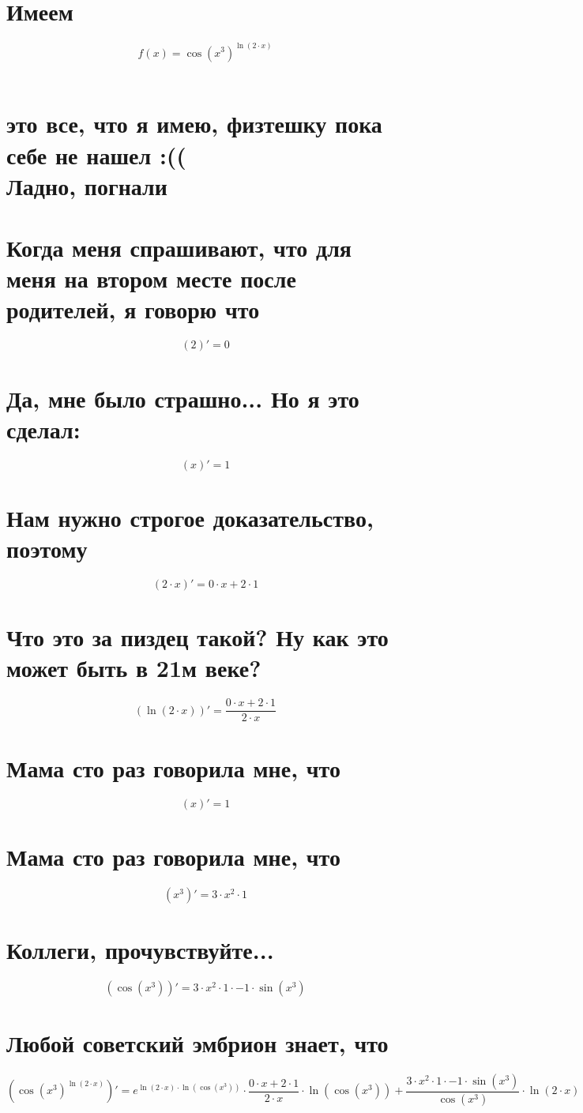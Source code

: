 \documentclass{article}
\begin{document}
\begin{Large}
\begin{onehalfspace}
\section*{Имеем}$$ f(x) = \cos(x^{3})^{\ln(2 \cdot x)}$$\\
\section*{это все, что я имею, физтешку пока себе не нашел :(( \\ Ладно, погнали}\section*{Когда меня спрашивают, что для меня на втором месте после родителей, я говорю что}
$$(2)' = 0$$
\section*{Да, мне было страшно... Но я это сделал:}
$$(x)' = 1$$
\section*{Нам нужно строгое доказательство, поэтому}
$$(2 \cdot x)' = 0 \cdot x + 2 \cdot 1$$
\section*{Что это за пиздец такой? Ну как это может быть в 21м веке?}
$$(\ln(2 \cdot x))' = \frac{0 \cdot x + 2 \cdot 1}{2 \cdot x}$$
\section*{Мама сто раз говорила мне, что}
$$(x)' = 1$$
\section*{Мама сто раз говорила мне, что}
$$(x^{3})' = 3 \cdot x^{2} \cdot 1$$
\section*{Коллеги, прочувствуйте...}
$$(\cos(x^{3}))' = 3 \cdot x^{2} \cdot 1 \cdot -1 \cdot \sin(x^{3})$$
\section*{Любой советский эмбрион знает, что}
$$(\cos(x^{3})^{\ln(2 \cdot x)})' = e^{\ln(2 \cdot x) \cdot \ln(\cos(x^{3}))} \cdot \frac{0 \cdot x + 2 \cdot 1}{2 \cdot x} \cdot \ln(\cos(x^{3})) + \frac{3 \cdot x^{2} \cdot 1 \cdot -1 \cdot \sin(x^{3})}{\cos(x^{3})} \cdot \ln(2 \cdot x)$$
\hline \vspace{1cm} \\

\end{onehalfspace}
\end{Large}
\end{document}
